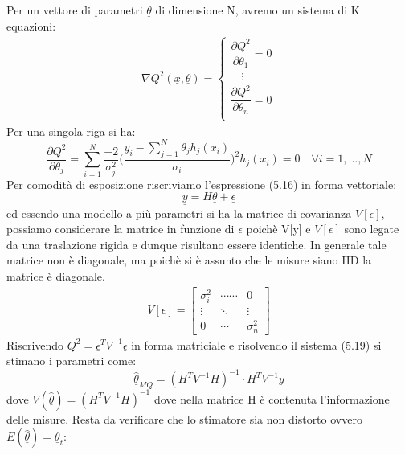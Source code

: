 \documentclass[11pt,a4paper]{book}
\begin{document}
Per un vettore di parametri $\underline{\theta}$ di dimensione N, avremo un sistema di K equazioni:
\begin{align}
 \nabla Q^2(\underline{x},\underline{\theta}) =
	\begin{cases}
		\dfrac{\partial Q^{2}}{\partial \theta_{1}} = 0 \\
		\quad \vdots \\
		\dfrac{\partial Q^{2}}{\partial \theta_{n}} = 0 \\
	\end{cases} 
\end{align}
Per una singola riga si ha:
\begin{equation}
	\dfrac{\partial Q^{2}}{\partial\theta_{j}} = \sum_{i=1}^N \dfrac{-2}{\sigma^2_{j}} \Big ( \dfrac{y_i - \sum_{j=1}^N \theta_j h_j(x_i)}{\sigma_i} \Big )^2h_j(x_i) = 0 \quad \forall i = 1,...,N
\end{equation}
\newline
\noindent Per comodit\`{a} di esposizione riscriviamo l'espressione (5.16) in forma vettoriale:
\begin{equation}
	\underline{y} = H \underline{\theta} + \underline{\epsilon}
\end{equation}
ed essendo una modello a pi\`{u} parametri si ha la matrice di covarianza $V[\epsilon]$, possiamo considerare la matrice in funzione di $\epsilon$ poich\`{e} V[y] e $V[\epsilon]$ sono legate da una traslazione rigida e dunque risultano essere identiche. In generale tale matrice non \`{e} diagonale, ma poich\`{e} si \`{e} assunto che le misure siano IID la matrice \`{e} diagonale.
\begin{align*}
V[\epsilon] = 
\begin{bmatrix}
	\sigma_i^2 & \cdots\cdots & 0 \\
	\vdots & \ddots & \vdots \\
	0 & \cdots & \sigma_n^2
	\end{bmatrix}
\end{align*}
Riscrivendo $Q^2 = \underline{\epsilon}^TV^{-1}\underline{\epsilon}$ in forma matriciale e risolvendo il sistema (5.19) si stimano i parametri come:
\begin{equation}
	\underline{\hat{\theta }}_{MQ} = (H^TV^{-1}H)^{-1}\cdot H^TV^{-1}\underline{y}
\end{equation}
dove $V(\underline{\hat{\theta}}) = (H^TV^{-1}H)^{-1}$ dove nella matrice H \`{e} contenuta l'informazione delle misure.\newline
\noindent Resta da verificare che lo stimatore sia non distorto ovvero $E(\underline{\hat{\theta}}) = \underline{\theta}_t$:
\end{document}
